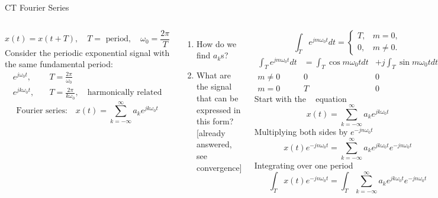 \begin{frame}[plain]{CT Fourier Series}
    \begin{columns}
            \begin{equation*}
                x(t) = x(t+T), \quad T = \text{ period},  \quad\omega_0 = \frac{2\pi}{T}
            \end{equation*}
            Consider the periodic exponential signal with the same fundamental period:
            \begin{align*}
                e^{j\omega_0 t},  & \quad T = \frac{2\pi}{\omega_0}\\
                e^{jk\omega_0 t},  &\quad  T = \frac{2\pi}{k\omega_0},  \quad \text{harmonically related}
            \end{align*}
            \begin{equation*}
                \text{Fourier series:}\quad  x(t) = \sum_{k=-\infty}^{\infty}a_k e^{jk\omega_0 t}
            \end{equation*}
            \pause
            \begin{enumerate}
              \item How do we find $a_k$s?
              \item What are the signal that can be expressed in this form? [already answered, see convergence]
            \end{enumerate}
            {
            \begin{equation*}
                \int_{T}e^{jm\omega_0t}dt = \begin{cases}T, & m=0,\\0, &m\neq 0.\end{cases}
            \end{equation*}
            \pause
            \begin{equation*}
                \begin{array}{ccc}
                    \int_{T}e^{jm\omega_0t}dt &= \int_{T}\cos m\omega_0 t dt &+  j\int_{T}\sin m\omega_0 t dt\\
                    m\neq 0 & 0 & 0\\
                    m = 0 & T & 0
                \end{array}
            \end{equation*}
            \pause
            Start with the \fs~ equation
            \begin{equation*}
                x(t) = \sum_{k=-\infty}^{\infty}a_k e^{jk\omega_0 t}
            \end{equation*}
            Multiplying both sides by $e^{-jn\omega_0t}$
            \begin{equation*}
                x(t)e^{-jn\omega_0t} = \sum_{k=-\infty}^{\infty}a_k e^{jk\omega_0 t}e^{-jn\omega_0t}
            \end{equation*}
            Integrating over one period
            \begin{equation*}
                \int_{T}x(t)e^{-jn\omega_0t} = \int_{T}\sum_{k=-\infty}^{\infty}a_k e^{jk\omega_0 t}e^{-jn\omega_0t}
            \end{equation*}

}
\end{columns}
\end{frame}
